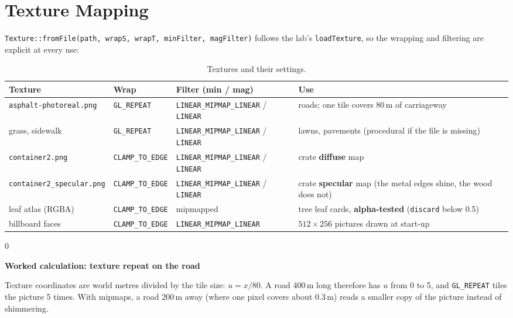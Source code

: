 \documentclass[11pt,a4paper]{article}
\newcommand{\code}[1]{\texttt{\small #1}}
\newenvironment{calc}[1]{\par\smallskip\noindent\begin{minipage}{\textwidth}\setlength{\fboxsep}{6pt}\begin{lrbox}{0}\begin{minipage}{0.955\textwidth}\textbf{Worked calculation: #1}\par\smallskip}{\end{minipage}\end{lrbox}\fbox{\usebox{0}}\end{minipage}\par\smallskip}
\begin{document}
\section{Texture Mapping}

\code{Texture::fromFile(path, wrapS, wrapT, minFilter, magFilter)} follows the lab's \code{loadTexture}, so the wrapping and filtering are explicit at every use:

\begin{table}[H]
\centering\small
\begin{tabularx}{\textwidth}{@{}l l l X@{}}
\toprule
Texture & Wrap & Filter (min / mag) & Use \\ \midrule
\code{asphalt-photoreal.png} & \code{GL\_REPEAT} & \code{LINEAR\_MIPMAP\_LINEAR} / \code{LINEAR} & roads; one tile covers 80\,m of carriageway \\
grass, sidewalk & \code{GL\_REPEAT} & \code{LINEAR\_MIPMAP\_LINEAR} / \code{LINEAR} & lawns, pavements (procedural if the file is missing) \\
\code{container2.png} & \code{CLAMP\_TO\_EDGE} & \code{LINEAR\_MIPMAP\_LINEAR} / \code{LINEAR} & crate \textbf{diffuse} map \\
\code{container2\_specular.png} & \code{CLAMP\_TO\_EDGE} & \code{LINEAR\_MIPMAP\_LINEAR} / \code{LINEAR} & crate \textbf{specular} map (the metal edges shine, the wood does not) \\
leaf atlas (RGBA) & \code{CLAMP\_TO\_EDGE} & mipmapped & tree leaf cards, \textbf{alpha-tested} (\code{discard} below 0.5) \\
billboard faces & \code{CLAMP\_TO\_EDGE} & \code{LINEAR\_MIPMAP\_LINEAR} & $512\times256$ pictures drawn at start-up \\
\bottomrule
\end{tabularx}
\caption{Textures and their settings.}
\end{table}

\begin{calc}{texture repeat on the road}
Texture coordinates are world metres divided by the tile size: $u = x/80$. A road 400\,m long therefore has $u$ from 0 to 5, and \code{GL\_REPEAT} tiles the picture 5 times. With mipmaps, a road 200\,m away (where one pixel covers about 0.3\,m) reads a smaller copy of the picture instead of shimmering.
\end{calc}
\end{document}
